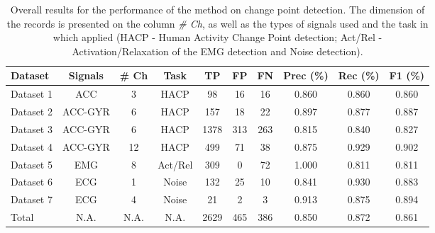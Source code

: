 \begin{table*}
	\begin{center}
		\begin{tabular}{lccccccccc}
			\toprule
			Dataset & Signals & \# Ch & Task & TP & FP & FN & Prec (\%) & Rec (\%) & F1 (\%) \\
			\toprule
			Dataset 1 & ACC & 3 & HACP & 98 & 16 & 16 & 0.860 & 0.860 & 0.860 \\
			Dataset 2 & ACC-GYR & 6 & HACP & 157 & 18 & 22 & 0.897 & 0.877 & 0.887 \\
			Dataset 3 & ACC-GYR & 6 & HACP & 1378 & 313 & 263 & 0.815 & 0.840 & 0.827 \\
			Dataset 4 & ACC-GYR & 12 & HACP & 499 & 71 & 38 & 0.875 & 0.929 & 0.902 \\
			Dataset 5 & EMG & 8 & Act/Rel & 309 & 0 & 72 & 1.000 & 0.811 & 0.811 \\
			Dataset 6  & ECG & 1 & Noise & 132 & 25 & 10 & 0.841 & 0.930 & 0.883 \\
			Dataset 7  & ECG & 4 & Noise & 21 & 2 & 3 & 0.913 & 0.875 & 0.894 \\
			\midrule
			Total  & N.A. & N.A. & N.A. & 2629 & 465 & 386 & 0.850 & 0.872 & 0.861 \\
			\bottomrule
		\end{tabular}
	\end{center}
	\caption{Overall results for the performance of the method on change point detection. The dimension of the records is presented on the column \textit{\# Ch}, as well as the types of signals used and the task in which  applied (HACP - Human Activity Change Point detection; Act/Rel - Activation/Relaxation of the EMG detection and Noise detection).}
	\label{tab:overall_cpd}
\end{table*}


